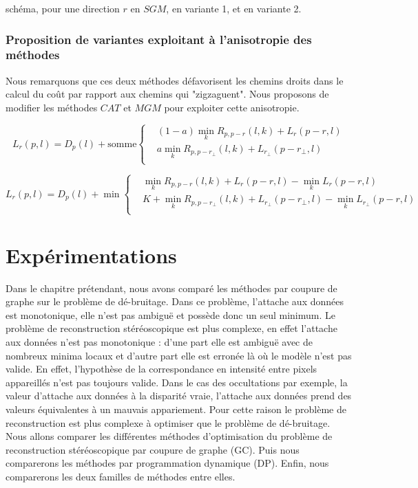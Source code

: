 \documentclass[../main/These_Mathias_Paget.tex]{subfiles}
\begin{document}
schéma, pour une direction $r$ en $SGM$, en variante 1, et en variante 2.


\subsubsection{Proposition de variantes exploitant à l'anisotropie des méthodes}

Nous remarquons que ces deux méthodes défavorisent les chemins droits dans le calcul du coût par rapport aux chemins qui "zigzaguent". Nous proposons de modifier les méthodes $CAT$ et $MGM$ pour exploiter cette anisotropie.

\begin{equation}
	L_r(p,l) = D_{p}(l) + \text{somme}{
  \left\{
      \begin{aligned}
      &  (1-a)\min_{k}{R_{p,p{-}r}(l,k) + L_{r}(p{-}r,l)} \\
      &  a\min_{k}{R_{p,p{-}r_{\perp}}(l,k) + L_{r_{\perp}}(p{-}r_{\perp},l)}  \\
      \end{aligned}
    \right.
    }
\end{equation}


\begin{equation}
	L_r(p,l) = D_{p}(l) + \min{
  \left\{
      \begin{aligned}
      &  \min_{k}{R_{p,p{-}r}(l,k) + L_{r}(p{-}r,l)} - \min_{k}{L_r(p{-}r,l)} \\
      &  K + \min_{k}{R_{p,p{-}r_{\perp}}(l,k) + L_{r_{\perp}}(p{-}r_{\perp},l)} - \min_{k}{L_{r_{\perp}}(p{-}r,l)} \\
      \end{aligned}
    \right.
    }
\end{equation}

\section{Expérimentations}
\label{s:Expe}

Dans le chapitre prétendant, nous avons comparé les méthodes par coupure de graphe sur le problème de dé-bruitage. Dans ce problème, l'attache aux données est monotonique, elle n'est pas ambiguë et possède donc un seul minimum. Le problème de reconstruction stéréoscopique est plus complexe, en effet l'attache aux données n'est pas monotonique : d'une part elle est ambiguë avec de nombreux minima locaux et d'autre part elle est erronée là où le modèle n'est pas valide. En effet, l'hypothèse de la correspondance en intensité entre pixels appareillés n'est pas toujours valide. Dans le cas des occultations par exemple, la valeur d'attache aux données à la disparité vraie, l'attache aux données prend des valeurs  équivalentes à un mauvais appariement. Pour cette raison le problème de reconstruction est plus complexe à optimiser que le problème de dé-bruitage. Nous allons comparer les différentes méthodes d'optimisation du problème de reconstruction stéréoscopique par coupure de graphe (GC). Puis nous comparerons les méthodes par programmation dynamique (DP). Enfin, nous comparerons les deux familles de méthodes entre elles.
\end{document}
